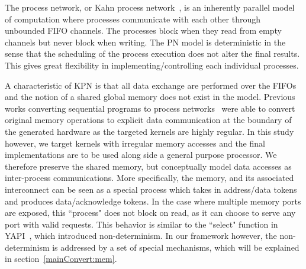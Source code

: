 \documentclass{sig-alternate}
\begin{document}
The process network, or Kahn process network~\cite{gilles1974semantics}, is an inherently parallel model of computation where processes communicate with
each other through unbounded FIFO channels.
The processes block when they read from empty channels but never block when writing.
The PN model is deterministic in the sense that the scheduling of
the process execution does not alter the final results. This gives great flexibility
in implementing/controlling each individual processes. 


A characteristic
of KPN is that all data exchange are performed over the FIFOs and the notion of
a shared global memory does not exist in the model. Previous works
converting sequential programs to process networks~\cite{mat2pn}\cite{c2stream}
were able to convert original memory operations to explicit data communication
at the boundary of the generated hardware as the targeted kernels are highly 
regular. In this study however, we target kernels with irregular memory accesses and the final implementations are to be used along side a general purpose processor. We therefore preserve the shared memory, but conceptually model data accesses as inter-process communications.
More specifically, the memory, and its associated interconnect can be seen as a special process which takes in address/data tokens and produces data/acknowledge tokens. In the case where multiple memory ports are exposed, this ``process" does not block on read, as it can choose to serve any port with valid
requests. This behavior is similar to the ``select" function in YAPI~\cite{Kock00yapi:application}, which introduced non-determinism. In our framework however, the non-determinism is addressed by a set of special mechanisms, which will be explained in section~\ref{mainConvert:mem}.
\end{document}
